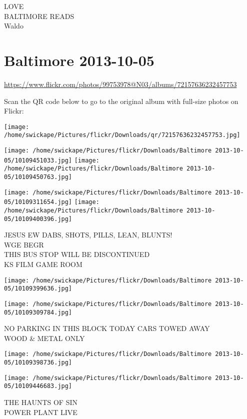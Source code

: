 \documentclass[10pt,letterpaper]{article}
\begin{document}
LOVE\\
BALTIMORE READS\\
Waldo
\pagebreak

\section*{Baltimore 2013-10-05}

\url{https://www.flickr.com/photos/99753978@N03/albums/72157636232457753}

Scan the QR code below to go to the original album with full-size photos on Flickr:

\texttt{[image: /home/swickape/Pictures/flickr/Downloads/qr/72157636232457753.jpg]}
\pagebreak

\texttt{[image: /home/swickape/Pictures/flickr/Downloads/Baltimore 2013-10-05/10109451033.jpg]}
\texttt{[image: /home/swickape/Pictures/flickr/Downloads/Baltimore 2013-10-05/10109450763.jpg]}

\texttt{[image: /home/swickape/Pictures/flickr/Downloads/Baltimore 2013-10-05/10109311654.jpg]}
\texttt{[image: /home/swickape/Pictures/flickr/Downloads/Baltimore 2013-10-05/10109400396.jpg]}

JESUS EW DABS, SHOTS, PILLS, LEAN, BLUNTS!\\
WGE BEGR\\
THIS BUS STOP WILL BE DISCONTINUED\\
KS FILM GAME ROOM
\pagebreak

\texttt{[image: /home/swickape/Pictures/flickr/Downloads/Baltimore 2013-10-05/10109399636.jpg]}

\vspace{0.25in}
\texttt{[image: /home/swickape/Pictures/flickr/Downloads/Baltimore 2013-10-05/10109309784.jpg]}

NO PARKING IN THIS BLOCK TODAY CARS TOWED AWAY\\
WOOD \& METAL ONLY
\pagebreak

\texttt{[image: /home/swickape/Pictures/flickr/Downloads/Baltimore 2013-10-05/10109398736.jpg]}

\vspace{0.25in}
\texttt{[image: /home/swickape/Pictures/flickr/Downloads/Baltimore 2013-10-05/10109446683.jpg]}

THE HAUNTS OF SIN\\
POWER PLANT LIVE
\pagebreak
\end{document}
